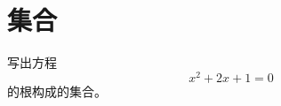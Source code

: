 \chapter{集合}
\begin{Ex}[课本第8页第3题]
  \mbox{} \par \noindent
  
写出方程
\begin{equation*}
x^2+2x+1=0
\end{equation*}
的根构成的集合。
\end{Ex}
